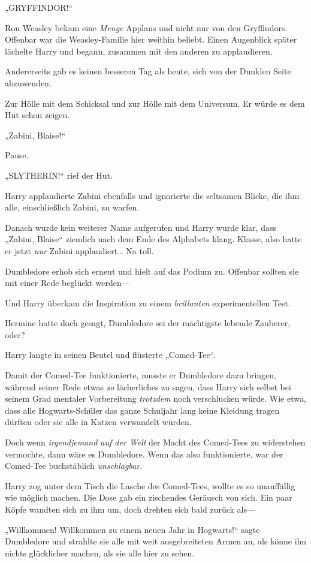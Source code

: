 {„GRYFFINDOR!“

Ron Weasley bekam eine \emph{Menge} Applaus und nicht nur von den Gryffindors. Offenbar war die Weasley-Familie hier weithin beliebt. Einen Augenblick später lächelte Harry und begann, zusammen mit den anderen zu applaudieren.

Andererseits gab es keinen besseren Tag als heute, sich von der Dunklen Seite abzuwenden.

Zur Hölle mit dem Schicksal und zur Hölle mit dem Universum. Er würde es dem Hut schon zeigen.

„Zabini, Blaise!“

Pause.

„SLYTHERIN!“ rief der Hut.

Harry applaudierte Zabini ebenfalls und ignorierte die seltsamen Blicke, die ihm alle, einschließlich Zabini, zu warfen.

Danach wurde kein weiterer Name aufgerufen und Harry wurde klar, dass „Zabini, Blaise“ ziemlich nach dem Ende des Alphabets klang. Klasse, also hatte er jetzt \emph{nur} Zabini applaudiert… Na toll.

Dumbledore erhob sich erneut und hielt auf das Podium zu. Offenbar sollten sie mit einer Rede beglückt werden—

Und Harry überkam die Inspiration zu einem \emph{brillanten} experimentellen Test.

Hermine hatte doch gesagt, Dumbledore sei der mächtigste lebende Zauberer, oder?

Harry langte in seinen Beutel und flüsterte „Comed-Tee“.

Damit der Comed-Tee funktionierte, musste er Dumbledore dazu bringen, während seiner Rede etwas \emph{so} lächerliches zu sagen, dass Harry sich selbst bei seinem Grad mentaler Vorbereitung \emph{trotzdem} noch verschlucken würde. Wie etwa, dass alle Hogwarts-Schüler das ganze Schuljahr lang keine Kleidung tragen dürften oder sie alle in Katzen verwandelt würden.

Doch wenn \emph{irgendjemand auf der Welt} der Macht des Comed-Tees zu widerstehen vermochte, dann wäre es Dumbledore. Wenn das also funktionierte, war der Comed-Tee buchstäblich \emph{unschlagbar}.

Harry zog unter dem Tisch die Lasche des Comed-Tees, wollte es so unauffällig wie möglich machen. Die Dose gab ein zischendes Geräusch von sich. Ein paar Köpfe wandten sich zu ihm um, doch drehten sich bald zurück als—

„Willkommen! Willkommen zu einem neuen Jahr in Hogwarts!“ sagte Dumbledore und strahlte sie alle mit weit ausgebreiteten Armen an, als könne ihn nichts glücklicher machen, als sie alle hier zu sehen.

}
